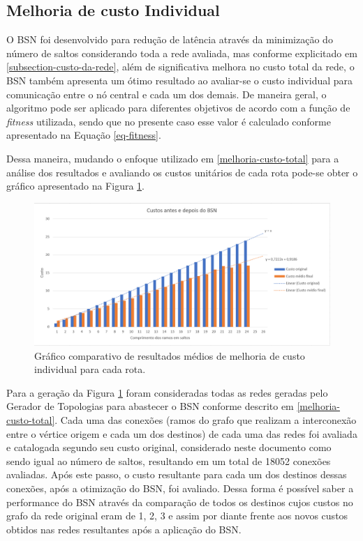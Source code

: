 \subsection{Melhoria de custo Individual}
\label{melhoria-custo-individual}
O BSN foi desenvolvido para redução de latência através da minimização do número de saltos considerando toda a rede avaliada, mas conforme explicitado em \ref{subsection-custo-da-rede}, além de significativa melhora no custo total da rede, o BSN também apresenta um ótimo resultado ao avaliar-se o custo individual para comunicação entre o nó central e cada um dos demais. De maneira geral, o algoritmo pode ser aplicado para diferentes objetivos de acordo com a função de \emph{fitness} utilizada, sendo que no presente caso esse valor é calculado conforme apresentado na Equação \ref{eq-fitness}.

Dessa maneira, mudando o enfoque utilizado em \ref{melhoria-custo-total} para a análise dos resultados e avaliando os custos unitários de cada rota pode-se obter o gráfico apresentado na Figura \ref{fig_graph_melhoria_por_custo}.

\begin{figure} [ht]%
	\centering
	\includegraphics[width=1\textwidth]{./figuras/Melhoria-por-custo.png} %
	\caption[Custo antes e depois do BSN]{Gráfico comparativo de resultados médios de melhoria de custo individual para cada rota.}
	\label{fig_graph_melhoria_por_custo}
\end{figure}

Para a geração da Figura \ref{fig_graph_melhoria_por_custo} foram consideradas todas as redes geradas pelo Gerador de Topologias para abastecer o BSN conforme descrito em \ref{melhoria-custo-total}. Cada uma das conexões (ramos do grafo que realizam a interconexão entre o vértice origem e cada um dos destinos) de cada uma das redes foi avaliada e catalogada segundo seu custo original, considerado neste documento como sendo igual ao número de saltos, resultando em um total de 18052 conexões avaliadas. Após este passo, o custo resultante para cada um dos destinos dessas conexões, após a otimização do BSN, foi avaliado. Dessa forma é possível saber a performance do BSN através da comparação de todos os destinos cujos custos no grafo da rede original eram de 1, 2, 3 e assim por diante frente aos novos custos obtidos nas redes resultantes após a aplicação do BSN.

